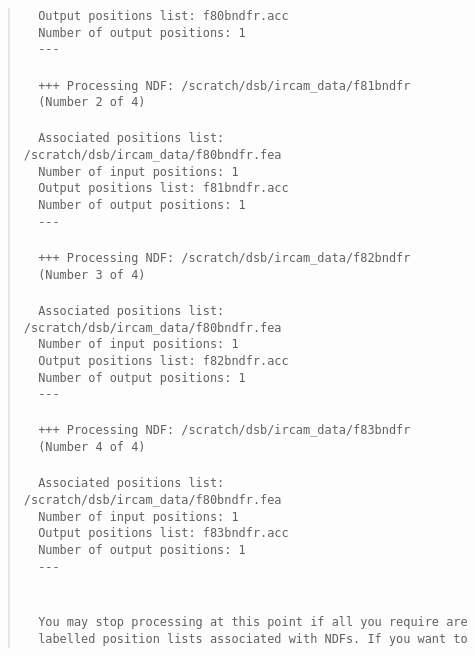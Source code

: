 \begin{quote}
\begin{tabbing}
\verb#  Output positions list: f80bndfr.acc#\\
\verb#  Number of output positions: 1#\\
\verb#  ---#\\
\verb##\\
\verb#  +++ Processing NDF: /scratch/dsb/ircam_data/f81bndfr#\\
\verb#  (Number 2 of 4)#\\
\verb##\\
\verb#  Associated positions list: /scratch/dsb/ircam_data/f80bndfr.fea#\\
\verb#  Number of input positions: 1#\\
\verb#  Output positions list: f81bndfr.acc#\\
\verb#  Number of output positions: 1#\\
\verb#  ---#\\
\verb##\\
\verb#  +++ Processing NDF: /scratch/dsb/ircam_data/f82bndfr#\\
\verb#  (Number 3 of 4)#\\
\verb##\\
\verb#  Associated positions list: /scratch/dsb/ircam_data/f80bndfr.fea#\\
\verb#  Number of input positions: 1#\\
\verb#  Output positions list: f82bndfr.acc#\\
\verb#  Number of output positions: 1#\\
\verb#  ---#\\
\verb##\\
\verb#  +++ Processing NDF: /scratch/dsb/ircam_data/f83bndfr#\\
\verb#  (Number 4 of 4)#\\
\verb##\\
\verb#  Associated positions list: /scratch/dsb/ircam_data/f80bndfr.fea#\\
\verb#  Number of input positions: 1#\\
\verb#  Output positions list: f83bndfr.acc#\\
\verb#  Number of output positions: 1#\\
\verb#  ---#\\
\verb##\\
\verb##\\
\verb#  You may stop processing at this point if all you require are#\\
\verb#  labelled position lists associated with NDFs. If you want to#\\

\end{tabbing}
\end{quote}
